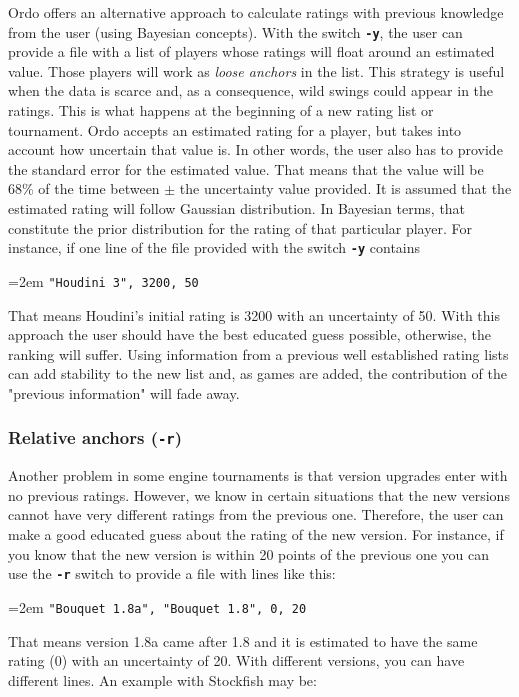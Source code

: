 \documentclass[12pt]{article}
\newcommand{\swtch} [1] {\texttt{\textbf{#1}}}
\newcommand{\cmdln}[1]{
	\par
	\begingroup
		\leftskip=2em
		\addtolength{\rightskip}{0em}
		\noindent \small{\texttt{#1}}
		\par
	\endgroup
}
\begin{document}
Ordo offers an alternative approach to calculate ratings with previous knowledge from the user (using Bayesian concepts). 
With the switch \swtch{-y}, the user can provide a file with a list of players whose ratings will float around an estimated value.
Those players will work as \textit{loose anchors} in the list.
This strategy is useful when the data is scarce and, as a consequence, wild swings could appear in the ratings.
This is what happens at the beginning of a new rating list or tournament. 
Ordo accepts an estimated rating for a player, but takes into account how uncertain that value is.
In other words, the user also has to provide the standard error for the estimated value. 
That means that the value will be 68\% of the time between $\pm$ the uncertainty value provided.
It is assumed that the estimated rating will follow Gaussian distribution. 
In Bayesian terms, that constitute the prior distribution for the rating of that particular player.
For instance, if one line of the file provided with the switch \swtch{-y} contains


\cmdln{"Houdini 3",  3200,  50}

That means Houdini's initial rating is 3200 with an uncertainty of 50. 
With this approach the user should have the best educated guess possible, otherwise, the ranking will suffer. 
Using information from a previous well established rating lists can add stability to the new list and, as games are added, the contribution of the "previous information" will fade away.

\subsubsection*{Relative anchors (\swtch{-r})}

Another problem in some engine tournaments is that version upgrades enter with no previous ratings. 
However, we know in certain situations that the new versions cannot have very different ratings from the previous one. 
Therefore, the user can make a good educated guess about the rating of the new version. 
For instance, if you know that the new version is within 20 points of the previous one you can use the \swtch{-r} switch to provide a file with lines like this:

\cmdln{"Bouquet 1.8a",    "Bouquet 1.8",   0, 20}

That means version 1.8a came after 1.8 and it is estimated to have the same rating (0) with an uncertainty of 20. 
With different versions, you can have different lines. An example with Stockfish may be:
\end{document}
